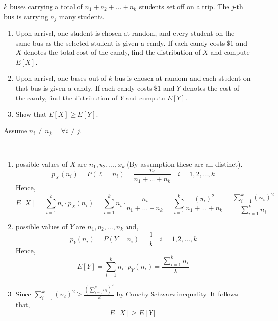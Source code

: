 \begin{example}
    $k$ buses carrying a total of $n_1 + n_2 + \dots + n_k$ students set off on
a trip. The $j$-th bus is carrying $n_j$ many students.
\begin{enumerate}[noitemsep, topsep=0em]
    \item 
    Upon arrival, one student is chosen at random, and every student on the
same bus as the selected student is given a candy. If each candy costs $\$1$
and $X$ denotes the total cost of the candy, find the distribution of $X$ and
compute $E[X]$.
    \item
    Upon arrival, one buses out of $k$-bus is chosen at random and each student
on that bus is given a candy. If each candy costs $\$1$ and $Y$ denotes the
cost of the candy, find the distribution of $Y$ and compute $E[Y]$.
    \item
    Show that $E[X] \geq E[Y]$.
\end{enumerate}
    Assume $n_i \neq n_j, \quad \forall i \neq j$.
\end{example}
\begin{solution} \quad                                                       \\
    \begin{enumerate}[noitemsep, topsep=0em]
        \item 
        possible values of $X$ are $n_1, n_2, \dots, x_k$ (By assumption these
        are all distinct).
        \begin{equation*}
            p_X(n_i) = P(X = n_i) = \frac{n_i}{n_1 + \dots +n_k} 
            \quad i = 1, 2, \dots, k
        \end{equation*}
        Hence, 
        \begin{equation*}
            E[X] = \sum_{i = 1}^k n_i \cdot p_X(n_i)
                 = \sum_{i = 1}^k n_i \cdot \frac{n_i}{n_1 + \dots + n_k}
                 = \sum_{i = 1}^k \frac{(n_i)^2}{n_1 + \dots + n_k}
                 = \frac{\sum_{i = 1}^k (n_i)^2}{\sum_{i = 1}^k n_i}
        \end{equation*}
        
        \item
        possible values of $Y$ are $n_1, n_2, \dots, n_k$ and,
        \begin{equation*}
            p_Y(n_i) = P(Y = n_i) = \frac{1}{k} \quad i = 1, 2, \dots, k
        \end{equation*}
        Hence,
        \begin{equation*}
            E[Y] = \sum_{i = 1}^k n_i \cdot p_Y(n_i)
                 = \frac{\sum_{i = 1}^k n_i}{k}
        \end{equation*}
        
        \item
        Since $\sum_{i=1}^k (n_i)^2 \geq \frac{(\sum_{i=1}^k n_i)^2}{k}$ by
        Cauchy-Schwarz inequality. It follows that, 
        \begin{equation*}
            E[X] \geq E[Y]
        \end{equation*}
    \end{enumerate}
\end{solution}

